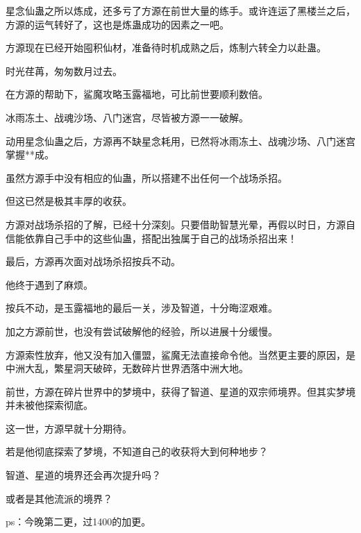 \begin{this_body}
星念仙蛊之所以炼成，还多亏了方源在前世大量的练手。或许连运了黑楼兰之后，方源的运气转好了，这也是炼蛊成功的因素之一吧。

方源现在已经开始囤积仙材，准备待时机成熟之后，炼制六转全力以赴蛊。

时光荏苒，匆匆数月过去。

在方源的帮助下，鲨魔攻略玉露福地，可比前世要顺利数倍。

冰雨冻土、战魂沙场、八门迷宫，尽皆被方源一一破解。

动用星念仙蛊之后，方源再不缺星念耗用，已然将冰雨冻土、战魂沙场、八门迷宫掌握**成。

虽然方源手中没有相应的仙蛊，所以搭建不出任何一个战场杀招。

但这已然是极其丰厚的收获。

方源对战场杀招的了解，已经十分深刻。只要借助智慧光晕，再假以时日，方源自信能依靠自己手中的这些仙蛊，搭配出独属于自己的战场杀招出来！

最后，方源再次面对战场杀招按兵不动。

他终于遇到了麻烦。

按兵不动，是玉露福地的最后一关，涉及智道，十分晦涩艰难。

加之方源前世，也没有尝试破解他的经验，所以进展十分缓慢。

方源索性放弃，他又没有加入僵盟，鲨魔无法直接命令他。当然更主要的原因，是中洲大乱，繁星洞天破碎，无数碎片世界洒落中洲大地。

前世，方源在碎片世界中的梦境中，获得了智道、星道的双宗师境界。但其实梦境并未被他探索彻底。

这一世，方源早就十分期待。

若是他彻底探索了梦境，不知道自己的收获将大到何种地步？

智道、星道的境界还会再次提升吗？

或者是其他流派的境界？

ps：今晚第二更，过1400的加更。

\end{this_body}

